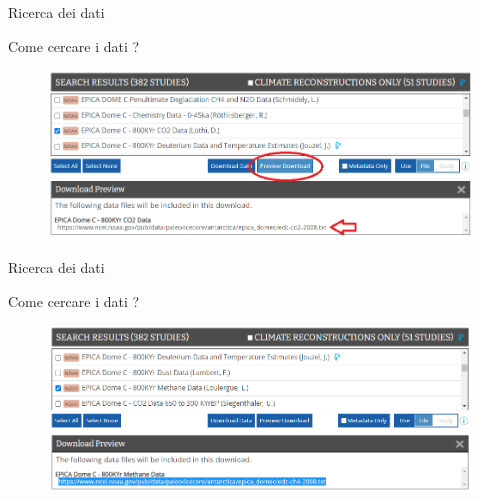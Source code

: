 \documentclass{beamer}
\begin{document}
\begin{frame}{Ricerca dei dati}
\begin{center}
Come cercare i dati ? 
\end{center}
\begin{figure}
\begin{center}
\includegraphics[width=\textwidth ]{Pic/NOAA_3.png}
\end{center}
\end{figure}
\end{frame}


\begin{frame}{Ricerca dei dati}
\begin{center}
Come cercare i dati ? 
\end{center}
\begin{figure}
\begin{center}
\includegraphics[width=\textwidth ]{Pic/NOAA_4.png}
\end{center}
\end{figure}
\end{frame}
\end{document}
